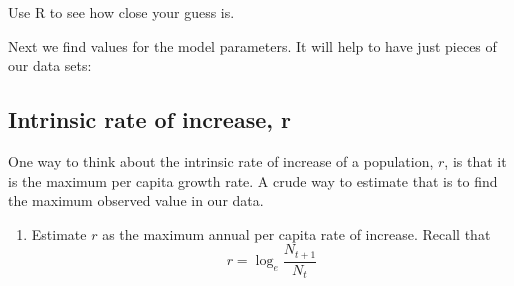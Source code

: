 \documentclass[
  letterpaper,
  DIV=11,
  numbers=noendperiod]{scrreprt}
\newenvironment{Shaded}{\begin{snugshade}}{\end{snugshade}}
\newcommand{\CommentTok}[1]{\textcolor[rgb]{0.37,0.37,0.37}{#1}}
\newcommand{\DecValTok}[1]{\textcolor[rgb]{0.68,0.00,0.00}{#1}}
\newcommand{\FunctionTok}[1]{\textcolor[rgb]{0.28,0.35,0.67}{#1}}
\newcommand{\NormalTok}[1]{\textcolor[rgb]{0.00,0.23,0.31}{#1}}
\newcommand{\OtherTok}[1]{\textcolor[rgb]{0.00,0.23,0.31}{#1}}
\newcommand{\SpecialCharTok}[1]{\textcolor[rgb]{0.37,0.37,0.37}{#1}}
\providecommand{\tightlist}{%
  \setlength{\itemsep}{0pt}\setlength{\parskip}{0pt}}
\begin{document}
Use R to see how close your guess is.

\begin{Shaded}
\end{Shaded}

Next we find values for the model parameters. It will help to have just
pieces of our data sets:

\begin{Shaded}
\end{Shaded}

\subsection{Intrinsic rate of increase,
r}\label{intrinsic-rate-of-increase-r}

One way to think about the intrinsic rate of increase of a population,
\(r\), is that it is the maximum per capita growth rate. A crude way to
estimate that is to find the maximum observed value in our data.

\begin{enumerate}
\def\labelenumi{\arabic{enumi}.}
\setcounter{enumi}{5}
\tightlist
\item
  Estimate \(r\) as the maximum annual per capita rate of increase.
  Recall that \[r = \log_e \frac{N_{t+1}}{N_t}\]
\end{enumerate}
\end{document}
